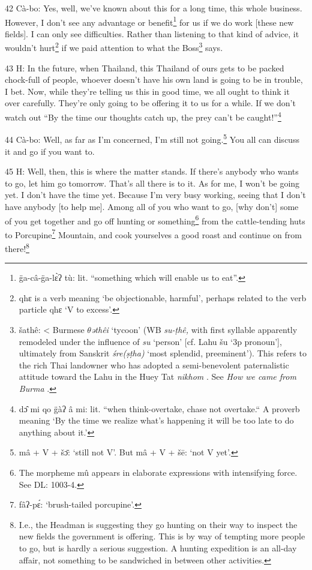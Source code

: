 42 Cà-bo: Yes, well, we've known about this for a long time, this whole business.
However, I don't see any advantage or benefit\footnote{g̈a-câ-g̈a-lɛ̀ʔ tù: lit. ``something which will enable us to eat''.} for us if we do work [these new
fields]. I can only see difficulties. Rather than listening to that kind of advice,
it wouldn't hurt\footnote{qhɛ is a verb meaning `be objectionable, harmful', perhaps related to the verb particle qhɛ `V to excess'.} if we paid attention to what the Boss\footnote{šathê: < Burmese  \textit{$\theta$əthêi } `tycoon' (WB  \textit{su-ṭhê, }with first syllable apparently remodeled under the influence of  \textit{su }`person' [cf. Lahu šu `3p pronoun'], ultimately from Sanskrit  \textit{śre(ṣṭha) } `most splendid, preeminent'). This refers to the rich Thai landowner who has adopted a semi-benevolent paternalistic attitude toward the Lahu in the Huey Tat \textit{nikhom }. See  \textit{How we came from Burma }.} says.

43 H: In the future, when Thailand, this Thailand of ours gets to be packed chock-full
of people, whoever doesn't have his own land is going to be in trouble, I bet.
Now, while they're telling us this in good time, we all ought to think it over
carefully. They're only going to be offering it to us for a while. If we don't
watch out ``By the time our thoughts catch up, the prey can't be caught!''\footnote{dɔ̂ mi qo g̈àʔ â mi: lit. ``when think-overtake, chase not overtake.`` A proverb meaning `By the time we realize what's happening it will be too late to do anything about it.'}

44 Cà-bo: Well, as far as I'm concerned, I'm still not going.\footnote{mâ + V + šɔ̄: `still not V'. But mâ + V + šē: `not V yet'.} You all can
discuss it and go if you want to.

45 H: Well, then, this is where the matter stands. If there's anybody who wants
to go, let him go tomorrow. That's all there is to it. As for me, I won't be going
yet. I don't have the time yet. Because I'm very busy working, seeing that I don't
have anybody [to help me]. Among all of you who want to go, [why don't] some of
you get together and go off hunting or something\footnote{The morpheme mû appears in elaborate expressions with intensifying force. See DL: 1003-4.} from the cattle-tending huts
to Porcupine\footnote{fâʔ-pɛ́: `brush-tailed porcupine'.} Mountain, and cook yourselves a good roast and continue on from
there!\footnote{I.e., the Headman is suggesting they go hunting on their way to inspect the new fields the government is offering. This is by way of tempting more people to go, but is hardly a serious suggestion. A hunting expedition is an all-day affair, not something to be sandwiched in between other activities.}

